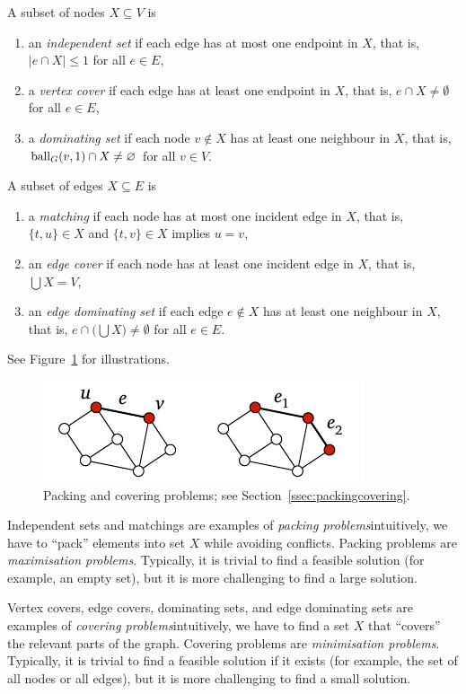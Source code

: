 A subset of nodes $X \subseteq V$ is
\begin{enumerate}
    \item an \emph{independent set} if each edge has at most one endpoint in $X$, that is, $|e \cap X| \le 1$ for all $e \in E$,
    \item a \emph{vertex cover} if each edge has at least one endpoint in $X$, that is, $e \cap X \ne \emptyset$ for all $e \in E$,
    \item a \emph{dominating set} if each node $v \notin X$ has at least one neighbour in $X$, that is, $\operatorname{ball}_G(v,1) \cap X \ne \varnothing$ for all $v \in V$.
\end{enumerate}
A subset of edges $X \subseteq E$ is
\begin{enumerate}[resume]
    \item a \emph{matching} if each node has at most one incident edge in $X$, that is, $\{t,u\} \in X$ and $\{t,v\} \in X$ implies $u = v$,
    \item an \emph{edge cover} if each node has at least one incident edge in $X$, that is, $\bigcup X = V$,
    \item an \emph{edge dominating set} if each edge $e \notin X$ has at least one neighbour in $X$, that is, $e \cap \bigl(\bigcup X\bigr) \ne \emptyset$ for all $e \in E$.
\end{enumerate}
See Figure~\ref{fig:packingcovering} for illustrations.
\begin{figure}
    \centering
    \includegraphics[page=\PPackingCovering]{figs.pdf}
    \caption{Packing and covering problems; see Section~\ref{ssec:packingcovering}.}\label{fig:packingcovering}
\end{figure}

Independent sets and matchings are examples of \emph{packing problems}\mydash intuitively, we have to ``pack'' elements into set $X$ while avoiding conflicts. Packing problems are \emph{maximisation problems}. Typically, it is trivial to find a feasible solution (for example, an empty set), but it is more challenging to find a large solution.

Vertex covers, edge covers, dominating sets, and edge dominating sets are examples of \emph{covering problems}\mydash intuitively, we have to find a set $X$ that ``covers'' the relevant parts of the graph. Covering problems are \emph{minimisation problems}. Typically, it is trivial to find a feasible solution if it exists (for example, the set of all nodes or all edges), but it is more challenging to find a small solution.

